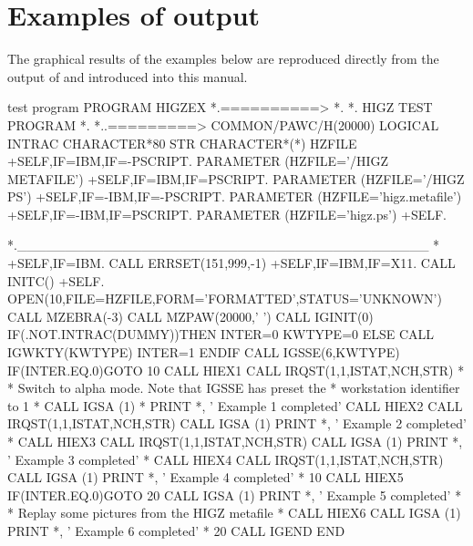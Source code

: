 \chapter{Examples of \HIGZ{} output}

The graphical results of the examples below are reproduced directly 
from the \PS{} output of and introduced into this manual.

\begin{XMPt}{\HIGZ{} test program}
      PROGRAM HIGZEX
*.==========>
*.
*.           HIGZ TEST PROGRAM
*.
*..=========>
      COMMON/PAWC/H(20000)
      LOGICAL INTRAC
      CHARACTER*80 STR
      CHARACTER*(*) HZFILE
+SELF,IF=IBM,IF=-PSCRIPT.
      PARAMETER (HZFILE='/HIGZ METAFILE')
+SELF,IF=IBM,IF=PSCRIPT.
      PARAMETER (HZFILE='/HIGZ PS')
+SELF,IF=-IBM,IF=-PSCRIPT.
      PARAMETER (HZFILE='higz.metafile')
+SELF,IF=-IBM,IF=PSCRIPT.
      PARAMETER (HZFILE='higz.ps')
+SELF.

*.___________________________________________
*
+SELF,IF=IBM.
      CALL ERRSET(151,999,-1)
+SELF,IF=IBM,IF=X11.
      CALL INITC()
+SELF.
      OPEN(10,FILE=HZFILE,FORM='FORMATTED',STATUS='UNKNOWN')
      CALL MZEBRA(-3)
      CALL MZPAW(20000,' ')
      CALL IGINIT(0)
      IF(.NOT.INTRAC(DUMMY))THEN
         INTER=0
         KWTYPE=0
      ELSE
         CALL IGWKTY(KWTYPE)
         INTER=1
      ENDIF
      CALL IGSSE(6,KWTYPE)
      IF(INTER.EQ.0)GOTO 10
      CALL HIEX1
      CALL IRQST(1,1,ISTAT,NCH,STR)
*
*          Switch to alpha mode. Note that IGSSE has preset the
*          workstation identifier to 1
*
      CALL IGSA (1)
*
      PRINT *, ' Example 1 completed'
      CALL HIEX2
      CALL IRQST(1,1,ISTAT,NCH,STR)
      CALL IGSA (1)
      PRINT *, ' Example 2 completed'
*
      CALL HIEX3
      CALL IRQST(1,1,ISTAT,NCH,STR)
      CALL IGSA (1)
      PRINT *, ' Example 3 completed'
*
      CALL HIEX4
      CALL IRQST(1,1,ISTAT,NCH,STR)
      CALL IGSA (1)
      PRINT *, ' Example 4 completed'
*
  10  CALL HIEX5
      IF(INTER.EQ.0)GOTO 20
      CALL IGSA (1)
      PRINT *, ' Example 5 completed'
*
*          Replay some pictures from the HIGZ metafile
*
      CALL HIEX6
      CALL IGSA (1)
      PRINT *, ' Example 6 completed'
*
  20  CALL IGEND
      END
\end{XMPt}

